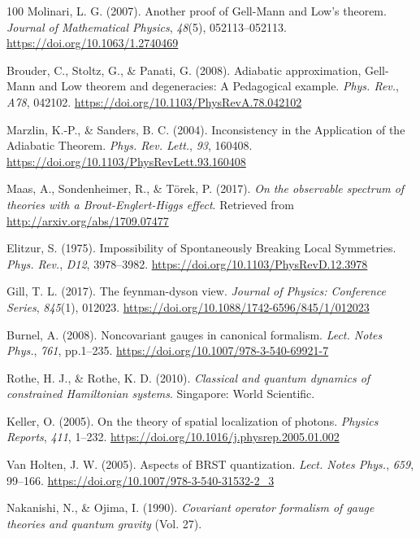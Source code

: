 \documentclass[11pt]{book}
\begin{document}
\begin{thebibliography}{100}
 Molinari, L. G. (2007). Another proof of Gell-Mann and Low's theorem.
\emph{Journal of Mathematical Physics}, \emph{48}(5), 052113--052113.
\url{https://doi.org/10.1063/1.2740469}

 Brouder, C., Stoltz, G., \& Panati, G. (2008). Adiabatic approximation,
Gell-Mann and Low theorem and degeneracies: A Pedagogical example.
\emph{Phys. Rev.}, \emph{A78}, 042102.
\url{https://doi.org/10.1103/PhysRevA.78.042102}

 Marzlin, K.-P., \& Sanders, B. C. (2004). Inconsistency in the
Application of the Adiabatic Theorem. \emph{Phys. Rev. Lett.},
\emph{93}, 160408. \url{https://doi.org/10.1103/PhysRevLett.93.160408}

 Maas, A., Sondenheimer, R., \& Törek, P. (2017). \emph{On the observable
spectrum of theories with a Brout-Englert-Higgs effect}. Retrieved from
\url{http://arxiv.org/abs/1709.07477}

 Elitzur, S. (1975). Impossibility of Spontaneously Breaking Local
Symmetries. \emph{Phys. Rev.}, \emph{D12}, 3978--3982.
\url{https://doi.org/10.1103/PhysRevD.12.3978}

 Gill, T. L. (2017). The feynman-dyson view. \emph{Journal of Physics:
Conference Series}, \emph{845}(1), 012023.
\url{https://doi.org/10.1088/1742-6596/845/1/012023}

 Burnel, A. (2008). Noncovariant gauges in canonical formalism.
\emph{Lect. Notes Phys.}, \emph{761}, pp.1--235.
\url{https://doi.org/10.1007/978-3-540-69921-7}

 Rothe, H. J., \& Rothe, K. D. (2010). \emph{Classical and quantum
dynamics of constrained Hamiltonian systems}. Singapore: World
Scientific.

 Keller, O. (2005). On the theory of spatial localization of photons.
\emph{Physics Reports}, \emph{411}, 1--232.
\url{https://doi.org/10.1016/j.physrep.2005.01.002}

 Van Holten, J. W. (2005). Aspects of BRST quantization. \emph{Lect.
Notes Phys.}, \emph{659}, 99--166.
\url{https://doi.org/10.1007/978-3-540-31532-2_3}

 Nakanishi, N., \& Ojima, I. (1990). \emph{Covariant operator formalism
of gauge theories and quantum gravity} (Vol. 27).


\end{thebibliography}
\end{document}

